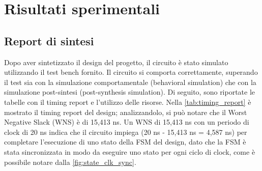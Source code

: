 \documentclass[11pt,a4paper]{article}
\begin{document}
\section{Risultati sperimentali}

\vspace{0.2em}\subsection{Report di sintesi}

\vspace{0.3em}\hspace{1em} Dopo aver sintetizzato il design del progetto, il circuito è stato simulato utilizzando il test bench fornito. Il circuito si comporta correttamente, superando il test sia con la simulazione comportamentale (behavioral simulation) che con la simulazione post-sintesi (post-synthesis simulation). Di seguito, sono riportate le tabelle con il timing report e l'utilizzo delle risorse. Nella \autoref{tab:timing_report} è mostrato il timing report del design; analizzandolo, si può notare che il Worst Negative Slack (WNS) è di 15,413 ns. Un WNS di 15,413 ns con un periodo di clock di 20 ns indica che il circuito impiega (20 ns - 15,413 ns = 4,587 ns) per completare l'esecuzione di uno stato della FSM del design, dato che la FSM è stata sincronizzata in modo da eseguire uno stato per ogni ciclo di clock, come è possibile notare dalla \autoref{fig:state_clk_sync}.
\end{document}
